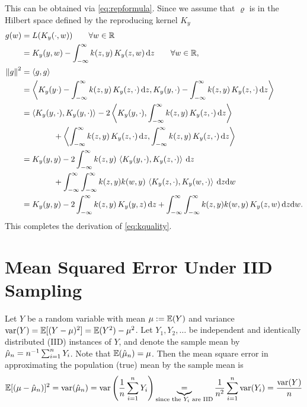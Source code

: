 \documentclass[letterpaper]{amsart}
\newcommand{\KY}{K_y}
\begin{document}
This can be obtained via \eqref{eq:repformula}.  Since we assume that $\varrho$ is in the Hilbert space defined by the reproducing kernel $\KY$
\begin{align*}
    g(w) &= L(\KY(\cdot,w)) \qquad \forall w \in \reals \\
    & = \KY(y,w) - \int_{-\infty}^{\infty} k(z,y) \, \KY(z,w) \, \dif z \qquad \forall w \in \reals, \\
    \norm{g}^2 &= \ip{g}{g} \\
    & = \ip{\KY(y\cdot) - \int_{-\infty}^{\infty} k(z,y) \, \KY(z,\cdot) \, \dif z}{\KY(y,\cdot) - \int_{-\infty}^{\infty} k(z,y) \, \KY(z,\cdot) \, \dif z} \\
    & = \ip{\KY(y,\cdot)}{\KY(y,\cdot)}
      - 2 \ip{\KY(y,\cdot)}{\int_{-\infty}^{\infty} k(z,y) \, \KY(z,\cdot) \, \dif z} \\
     & \qquad \qquad   + \ip{\int_{-\infty}^{\infty} k(z,y) \, \KY(z,\cdot) \, \dif z}{\int_{-\infty}^{\infty} k(z,y) \, \KY(z,\cdot) \, \dif z} \\
    & = \KY(y,y)
      - 2 \int_{-\infty}^{\infty} k(z,y) \, \ip{\KY(y,\cdot)}{\KY(z,\cdot)} \, \dif z \\
    & \qquad \qquad   + \int_{-\infty}^{\infty} \int_{-\infty}^{\infty} k(z,y) k(w,y) \, \ip{ \KY(z,\cdot)}{\KY(w,\cdot)} \,  \dif z\dif w \\
   & = \KY(y,y)
      - 2 \int_{-\infty}^{\infty} k(z,y) \, \KY(y,z) \, \dif z
     + \int_{-\infty}^{\infty} \int_{-\infty}^{\infty} k(z,y) k(w,y) \, \KY(z,w) \,  \dif z\dif w.
\end{align*}
This completes the derivation of \eqref{eq:kquality}.

\section{Mean Squared Error Under IID Sampling} \label{app:MSE}
Let $Y$ be a random variable with mean $\mu :=  \operatorname{\mathbb{E}}(Y)$ and variance $\operatorname{var}(Y) = \operatorname{\mathbb{E}}[(Y - \mu)^2] = \operatorname{\mathbb{E}}(Y^2) - \mu^2$.  Let $Y_1, Y_2, \ldots$ be independent and identically distributed (IID) instances of $Y$, and denote the sample mean by $\hat{\mu}_n = n^{-1} \sum_{i=1}^n Y_i$.  Note that $\operatorname{\mathbb{E}}(\hat{\mu}_n) = \mu$.  Then the mean square error in approximating the population (true) mean by the sample mean is
\begin{equation*}
    \operatorname{\mathbb{E}}[(\mu - \hat{\mu}_n)]^2  =  \operatorname{var}(\hat{\mu}_n) = \operatorname{var} \left (\frac{1}{n} \sum_{i=1}^n Y_i \right) \underbrace{=}_{\text{since the $Y_i$ are IID}} \frac 1{n^2} \sum_{i=1}^n \operatorname{var}(Y_i) = \frac{\operatorname{var}(Y)}{n}
\end{equation*}
\end{document}
